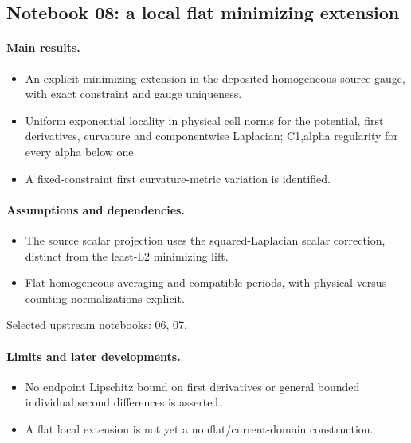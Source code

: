 \subsection{Notebook 08: a local flat minimizing extension}
\label{hnc-08}
\noindent{}\par

\paragraph{Main results.}
\begin{itemize}
\item An explicit minimizing extension in the deposited homogeneous source gauge, with exact constraint and gauge uniqueness.
\item Uniform exponential locality in physical cell norms for the potential, first derivatives, curvature and componentwise Laplacian; C1,alpha regularity for every alpha below one.
\item A fixed-constraint first curvature-metric variation is identified.
\end{itemize}

\paragraph{Assumptions and dependencies.}
\begin{itemize}
\item The source scalar projection uses the squared-Laplacian scalar correction, distinct from the least-L2 minimizing lift.
\item Flat homogeneous averaging and compatible periods, with physical versus counting normalizations explicit.
\end{itemize}

Selected upstream notebooks: 06, 07.\par

\paragraph{Limits and later developments.}
\begin{itemize}
\item No endpoint Lipschitz bound on first derivatives or general bounded individual second differences is asserted.
\item A flat local extension is not yet a nonflat/current-domain construction.
\end{itemize}

